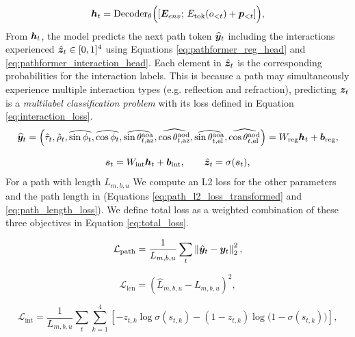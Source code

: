 \begin{equation}
\boldsymbol{h}_t
=
\mathrm{Decoder}_{\theta}
\Big(
[\boldsymbol{E}_{env};\,E_{\mathrm{tok}}(o_{<t}) + \boldsymbol{p}_{<t}]
\Big),
\label{eq:backbone}
\end{equation}
From $\boldsymbol{h}_t$, the model predicts the next path token $\widehat{\boldsymbol{y}}_t$ including the interactions experienced  $\hat{\boldsymbol{z}}_t \in [0,1]^4$ using Equations \ref{eq:pathformer_reg_head} and \ref{eq:pathformer_interaction_head}. Each element in $\hat{\boldsymbol{z}}_t$ is the corresponding probabilities for the interaction labels. This is because a path may simultaneously experience multiple interaction types (e.g. reflection and refraction), predicting $\boldsymbol{z}_t$ is a \emph{multilabel classification problem} with its loss defined in Equation \ref{eq:interaction_loss}.
\begin{equation}
\widehat{\boldsymbol{y}}_t =
\Big(
\hat{\tau}_t,\hat{\rho}_t,
\widehat{\sin\phi_t},\widehat{\cos\phi_t},
\widehat{\sin\theta^{\mathrm{aoa}}_{t,\mathrm{az}}},\widehat{\cos\theta^{\mathrm{aod}}_{t,\mathrm{az}}},
\widehat{\sin\theta^{\mathrm{aoa}}_{t,\mathrm{el}}},\widehat{\cos\theta^{\mathrm{aod}}_{t,\mathrm{el}}}
\Big)
=
W_{\mathrm{reg}}\boldsymbol{h}_t + \boldsymbol{b}_{\mathrm{reg}},
\label{eq:pathformer_reg_head}
\end{equation}

\begin{equation}
\boldsymbol{s}_t
=
W_{\mathrm{int}}\boldsymbol{h}_t + \boldsymbol{b}_{\mathrm{int}},
\qquad
\hat{\boldsymbol{z}}_t = \sigma(\boldsymbol{s}_t),
\label{eq:pathformer_interaction_head}
\end{equation}
For a path with length $L_{m,b,u}$ We compute an L2 loss for the other parameters and the path length in (Equations \ref{eq:path_l2_loss_transformed} and \ref{eq:path_length_loss}). We define total loss as a weighted combination of these three objectives in Equation \ref{eq:total_loss}.

\begin{equation}
\mathcal{L}_{\mathrm{path}}
=
\frac{1}{L_{m,b,u}}
\sum_{t}
\left\|
\hat{\boldsymbol{y}}_t-\boldsymbol{y}_t
\right\|_2^2,
\label{eq:path_l2_loss_transformed}
\end{equation}

\begin{equation}
\mathcal{L}_{\mathrm{len}}
=
\left(
\hat{L}_{m,b,u}-L_{m,b,u}
\right)^2,
\label{eq:path_length_loss}
\end{equation}


\begin{equation}
\mathcal{L}_{\mathrm{int}}
=
\frac{1}{L_{m,b,u}}
\sum_{t}\sum_{k=1}^{4}
\left[
-z_{t,k}\log \sigma(s_{t,k})
-(1-z_{t,k})\log\big(1-\sigma(s_{t,k})\big)
\right],
\label{eq:interaction_loss}
\end{equation}

